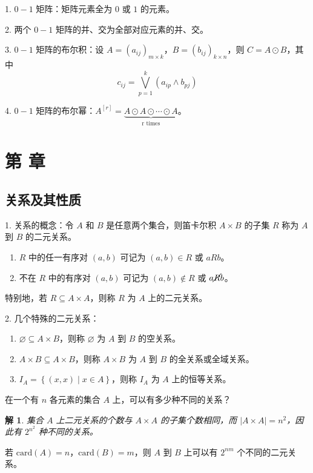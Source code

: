 \documentclass[normal,cyan]{elegantnote}
\newcommand{\roma}[1]{\uppercase\expandafter{\romannumeral#1}}
\newtheorem{solve}{解}
\begin{document}
1. $0 - 1$ 矩阵：矩阵元素全为 $0$ 或 $1$ 的元素。

2. 两个 $0 - 1$ 矩阵的并、交为全部对应元素的并、交。

3. $0 - 1$ 矩阵的布尔积：设 $A = \left(a_{ij}\right)_{m \times k}$，$B = \left(b_{ij}\right)_{k \times n}$，则 $C = A \odot B$，其中 $$c_{ij} = \bigvee\limits_{p = 1}^k(a_{ip}\wedge b_{pj})$$

4. $0 - 1$ 矩阵的布尔幂：$A^{[r]} = \underbrace{A \odot A \odot \cdots \odot A}_{\text{r times}}$。

\section{第 \roma{9} 章}
\subsection{关系及其性质}

1. 关系的概念：令 $A$ 和 $B$ 是任意两个集合，则笛卡尔积 $A \times B$ 的子集 $R$ 称为{\color{red} $A$ 到 $B$ 的二元关系}。
\begin{enumerate}[1)]
    \item $R$ 中的任一有序对 $(a, b)$ 可记为 $(a, b) \in R$ 或 $aRb$。
    \item 不在 $R$ 中的有序对 $(a, b)$ 可记为 $(a, b) \notin R$ 或 $a \cancel{R} b$。
\end{enumerate}
特别地，若 $R \subseteq A \times A$，则称 $R$ 为{\color{red} $A$ 上的二元关系}。

2. 几个特殊的二元关系：
\begin{enumerate}[1)]
    \item $\varnothing \subseteq A \times B$，则称 $\varnothing$ 为 $A$ 到 $B$ 的{\color{red}空关系}。
    \item $A \times B \subseteq A \times B$，则称 $A \times B$ 为 $A$ 到 $B$ 的{\color{red}全关系}或{\color{red}全域关系}。
    \item $I_A = \left\{(x, x) \mid x \in A\right\}$，则称 $I_A$ 为 $A$ 上的{\color{red}恒等关系}。
\end{enumerate}

\begin{example}
    在一个有 $n$ 各元素的集合 $A$ 上，可以有多少种不同的关系？
\end{example}
\begin{solve}
    集合 $A$ 上二元关系的个数与 $A \times A$ 的子集个数相同，而 $\left|A \times A\right| = n^2$，因此有 $2^{n^2}$ 种不同的关系。
\end{solve}
\begin{note}
    若 $\mathrm{card}(A) = n$，$\mathrm{card}(B) = m$，则 $A$ 到 $B$ 上可以有 $2^{nm}$ 个不同的二元关系。
\end{note}
\end{document}
